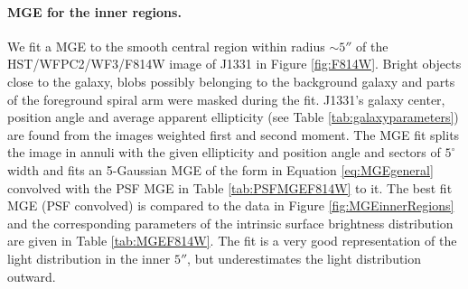\paragraph{MGE for the inner regions.} We fit a MGE to the smooth central region within radius $\sim 5''$ of the HST/WFPC2/WF3/F814W image of J1331 in Figure \ref{fig:F814W}. Bright objects  close to the galaxy, blobs possibly belonging to the background galaxy and parts of the foreground spiral arm were masked during the fit. J1331's galaxy center, position angle and average apparent ellipticity (see Table \ref{tab:galaxyparameters}) are found from the images weighted first and second moment. The MGE fit splits the image in annuli with the given ellipticity and position angle and sectors of $5^\circ$ width and fits an 5-Gaussian MGE of the form in Equation \ref{eq:MGEgeneral} convolved with the PSF MGE in Table \ref{tab:PSFMGEF814W} to it. The best fit MGE (PSF convolved) is compared to the data in Figure \ref{fig:MGEinnerRegions} and the corresponding parameters of the intrinsic surface brightness distribution are given in Table \ref{tab:MGEF814W}. The fit is a very good representation of the light distribution in the inner $5''$, but underestimates the light distribution outward.

